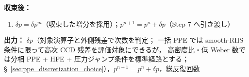 \textbf{収束後：}
\begin{enumerate}
  \item[(6.5)] $\delta p = \delta p^m$（収束した増分を採用）；$p^{n+1} = p^n + \delta p$（Step 7 へ引き渡し）
\end{enumerate}

\textbf{出力：} $\delta p$（対象演算子と外側残差で次数を判定；
一括 PPE では smooth-RHS 条件に限って高次 CCD 残差を評価対象にできるが，
高密度比・低 Weber 数では分相 PPE + HFE + 圧力ジャンプ条件を標準経路とする；
§~\ref{sec:ppe_discretization_choice}），$p^{n+1} = p^n + \delta p$，総反復回数
